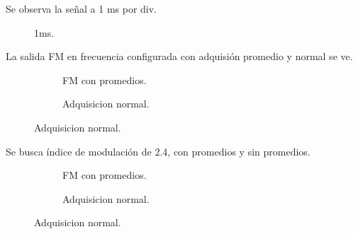     Se observa la señal a 1 ms por div.

      \begin{figure}[H]
        \centering
          \caption{1ms.}
          \label{fig:Exp6SeñalFM1ms}
      \end{figure}

    La salida FM en frecuencia configurada con adquisión promedio y normal 
    se ve.

      \begin{figure}[H]
        \centering
        \begin{subfigure}[H]{0.48\textwidth}
          \caption{FM con promedios.}
          \label{fig:Exp6SeñalFM}
        \end{subfigure}
        \hfill 
        \begin{subfigure}[H]{0.48\textwidth}
          \caption{Adquisicion normal.}
          \label{fig:Exp6SeñalFMAdquisicionNormal}
        \end{subfigure}
      \end{figure}

    Se busca índice de modulación de 2.4, con promedios y sin promedios.

      \begin{figure}[H]
        \centering
        \begin{subfigure}[H]{0.48\textwidth}
          \caption{FM con promedios.}
          \label{fig:Exp6SeñalFMIndice2_4}
        \end{subfigure}
        \hfill 
        \begin{subfigure}[H]{0.48\textwidth}
          \caption{Adquisicion normal.}
          \label{fig:Exp6SeñalFMIndice2_4AdquisicionNormal}
        \end{subfigure}
      \end{figure}   

